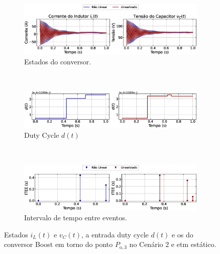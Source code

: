 \begin{figure}[H]
  \centering
  \captionsetup{justification=centering}
  \begin{subfigure}{1.\textwidth}
    \centering
    \includegraphics[width=1.\textwidth]{figuras/static-etm/boost/sim2/op1/result.eps}
    \caption{Estados do conversor.}
    \label{fig:boost_converter_variable_pcpl_static_etm_op1_duty_a}
  \end{subfigure}
  \\[6pt]
  \begin{subfigure}{1.\textwidth}
    \centering
    \includegraphics[width=1.\textwidth]{figuras/static-etm/boost/sim2/op1/duty-cycle.eps}
    \caption{Duty Cycle $d(t)$}
    \label{fig:boost_converter_variable_pcpl_static_etm_op1_duty_b}
  \end{subfigure}
  \\[6pt]
  \begin{subfigure}{1.\textwidth}
    \centering
    \includegraphics[width=1.\textwidth]{figuras/static-etm/boost/sim2/op1/inter-event-times.eps}
    \caption{Intervalo de tempo entre eventos.}
    \label{fig:boost_converter_variable_pcpl_static_etm_op1_duty_c}
  \end{subfigure}
  \caption{Estados $i_L(t)$ e $v_C(t)$, a entrada duty cycle $d(t)$ e os  do conversor Boost em torno do ponto $P_{\mathrm{o}, 3}$ no Cenário 2 e \acrshort{etm} estático.}
\end{figure}

